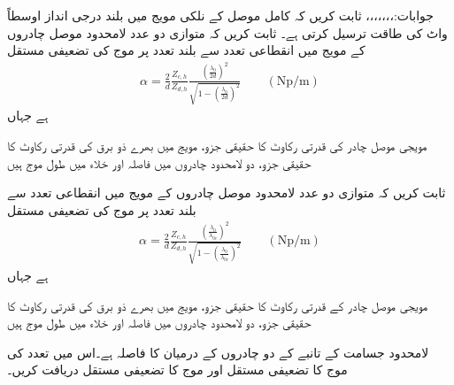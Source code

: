 جوابات:،،،،،،،
ثابت کریں کہ کامل موصل کے نلکی مویج میں  بلند درجی انداز اوسطاً  واٹ کی طاقت ترسیل کرتی ہے۔
ثابت کریں کہ متوازی دو عدد لامحدود موصل چادروں کے مویج میں انقطاعی تعدد سے بلند تعدد پر  موج کی تضعیفی مستقل
\begin{align*}
 \alpha=\frac{2}{d}\frac{Z_{c,h}}{Z_{d,h}}\frac{\left(\frac{\lambda_0}{2d}\right)^2}{\sqrt{1-\left(\frac{\lambda_0}{2d}\right)^2}} \quad \quad (\si{\neper/ \meter})
\end{align*}
 ہے جہاں
\begin{description}
 مویجی موصل چادر کی قدرتی رکاوٹ کا حقیقی جزو،
 مویج میں بھرے ذو برق کی قدرتی رکاوٹ کا حقیقی جزو،
 دو لامحدود چادروں میں فاصلہ اور
 خلاء میں طول موج ہیں
\end{description}
ثابت کریں کہ متوازی دو عدد لامحدود موصل چادروں کے مویج میں انقطاعی تعدد سے بلند تعدد پر  موج کی تضعیفی مستقل
\begin{align*}
 \alpha=\frac{2}{d}\frac{Z_{c,h}}{Z_{d,h}}\frac{\left(\frac{\lambda_0}{\lambda_{0c}}\right)^2}{\sqrt{1-\left(\frac{\lambda_0}{\lambda_{0c}}\right)^2}} \quad \quad (\si{\neper/ \meter})
\end{align*}
 ہے جہاں
\begin{description}
 مویجی موصل چادر کے قدرتی رکاوٹ کا حقیقی جزو،
 مویج میں بھرے ذو برق کی قدرتی رکاوٹ کا حقیقی جزو،
 دو لامحدود چادروں میں فاصلہ اور
 خلاء میں طول موج ہیں
\end{description}
لامحدود جسامت کے تانبے کے دو چادروں کے درمیان  کا فاصلہ ہے۔اس میں  تعدد کی  موج کا تضعیفی مستقل اور  موج  کا تضعیفی مستقل دریافت کریں۔ 

